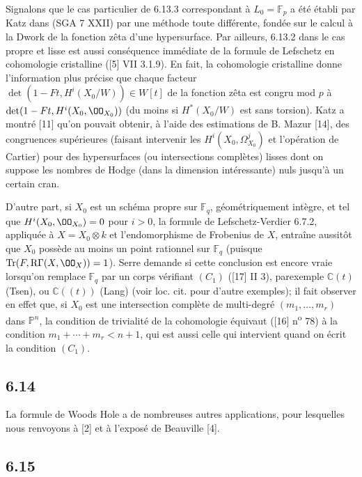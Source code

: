 Signalons que le cas particulier de 6.13.3 correspondant à $L_0=\mathbb{F}_p$ a été établi par Katz dans (SGA 7 XXII) par une méthode toute différente, fondée sur le calcul à la Dwork de la fonction zêta d'une hypersurface. Par ailleurs, 6.13.2 dans le cas propre et lisse est aussi conséquence immédiate de la formule de Lefschetz en cohomologie cristalline ([5] VII 3.1.9). En fait, la cohomologie cristalline donne l'information plus précise que chaque facteur $\det(1-Ft,H^i(X_0/W))\in W[t]$ de la fonction zêta est congru mod $p$ à $\det(1-Ft,H^i(X_0,\OO_{X_0}))$ (du moins si $H^*(X_0/W)$ est sans torsion). Katz a montré [11] qu'on pouvait obtenir, à l'aide des estimations de B. Mazur [14], des congruences supérieures (faisant intervenir les $H^i(X_0,\Omega^j_{X_0})$ et l'opération de Cartier) pour des hypersurfaces (ou intersections complètes) lisses dont on suppose les nombres de Hodge (dans la dimension intéressante) nuls jusqu'à un certain cran.

D'autre part, si $X_0$ est un schéma propre sur $\mathbb{F}_q$, géométriquement intègre, et tel que $H^i(X_0,\OO_{X_0})=0$ pour $i>0$, la formule de Lefschetz-Verdier 6.7.2, appliquée à $X=X_0\otimes k$ et l'endomorphisme de Frobenius de $X$, entraîne aussitôt que $X_0$ possède au moins un point rationnel sur $\mathbb{F}_q$ (puisque $\operatorname{Tr}(F,\mathrm{R}\Gamma(X,\OO_X))=1$). Serre demande si cette conclusion est encore vraie lorsqu'on remplace $\mathbb{F}_q$ par un corps vérifiant $(C_1)$ ([17] II 3), parexemple $\mathbb{C}(t)$ (Tsen), ou $\mathbb{C}((t))$ (Lang) (voir loc. cit. pour d'autre exemples); il fait observer en effet que, si $X_0$ est une intersection complète de multi-degré $(m_1,\ldots,m_r)$ dans $\mathbb{P}^n$, la condition de trivialité de la cohomologie équivaut ([16] n\textsuperscript{o} 78) à la condition $m_1+\cdots+m_r<n+1$, qui est aussi celle qui intervient quand on écrit la condition $(C_1)$.

\subsection*{6.14}
La
formule de Woods Hole a de nombreuses autres applications, pour lesquelles nous renvoyons à [2] et à l'exposé de Beauville [4].


\subsection*{6.15}


